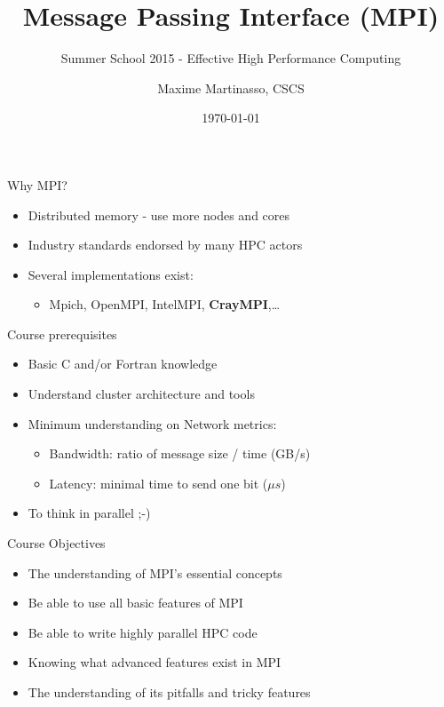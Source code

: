 \documentclass[aspectratio=43]{beamer}
\author{Maxime Martinasso, CSCS}
\title{Message Passing Interface (MPI)}
\subtitle{Summer School 2015 - Effective High Performance Computing}
\date{\today}
\begin{document}
\cscstitle

\begin{frame}{Why MPI?}
\begin{itemize}
    \item Distributed memory - use more nodes and cores
    \item Industry standards endorsed by many HPC actors
    \item Several implementations exist:
    \begin{itemize}
        \item Mpich, OpenMPI, IntelMPI, \textbf{CrayMPI},\ldots
    \end{itemize}
\end{itemize}
\end{frame}

\begin{frame}{Course prerequisites}
\begin{itemize}
    \item Basic C and/or Fortran knowledge
    \item Understand cluster architecture and tools
    \item Minimum understanding on Network metrics:
    \begin{itemize}
        \item Bandwidth: ratio of message size / time (GB/s)
        \item Latency: minimal time to send one bit ($\mu s$)
    \end{itemize}
    \item To think in parallel ;-)
\end{itemize}
\end{frame}

\begin{frame}{Course Objectives}
\begin{itemize}
\item The understanding of MPI’s essential concepts
\item Be able to use all basic features of MPI
\item Be able to write highly parallel HPC code
\item Knowing what advanced features exist in MPI
\item The understanding of its pitfalls and tricky features
\end{itemize}
\end{frame}
\end{document}
